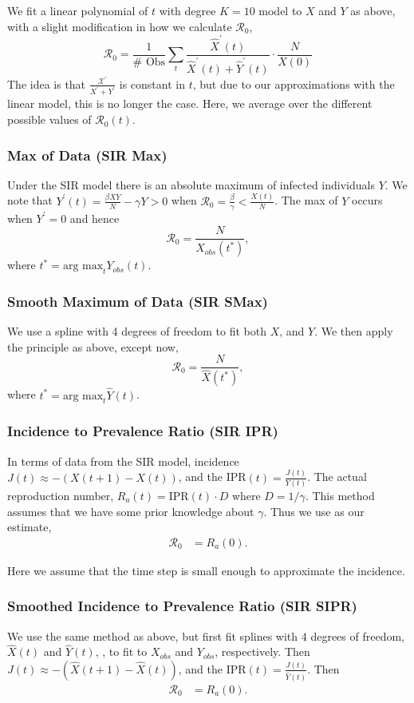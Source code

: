 \documentclass[12pt]{article}
\newcommand{\rr}{\ensuremath{\mathcal{R}_0}}
\begin{document}
We fit a linear polynomial of \(t\) with degree \(K= 10\) model to \(X\)
and \(Y\) as above, with a slight modification in how we calculate
\(\rr\),
\[\rr = \frac{1}{\# \text{ Obs}}\sum_t \frac{\hat{X}^\prime(t)}{ \hat{X}^\prime(t) + \hat{Y}^\prime(t)} \cdot \frac{N}{X(0)} \]
The idea is that $\frac{\mathcal{X}^\prime}{X^\prime + Y^\prime}$ is constant in $t$, but due to our approximations with the linear model, this is no longer the case.  Here, we average over the different possible values of $\rr(t)$.

\subsubsection{Max of Data (SIR Max)}\label{max-of-data}

Under the SIR model there is an absolute maximum of infected individuals $Y$.  We note that \(Y^\prime(t) = \frac{\beta XY}{N} - \gamma Y > 0\) when \(\rr = \frac{\beta}{\gamma} < \frac{X(t)}{N}\). The max
of \(Y\) occurs when \(Y^\prime = 0\) and hence
\[\rr = \frac{N}{X_{obs}(t^*)},\] where
\(t^* = \text{arg max}_{t} Y_{obs}(t)\).  

\subsubsection{Smooth Maximum of Data (SIR SMax)}\label{smooth-maximum-of-data}

We use a spline with 4 degrees of freedom to fit both \(X\), and \(Y\).
We then apply the principle as above, except now,
\[\rr = \frac{N}{\hat{X}(t^*)},\] where
\(t^* = \text{arg max}_{t} \hat{Y}(t)\). 

\subsubsection{Incidence to Prevalence
Ratio (SIR IPR)}\label{incidence-to-prevalence-ratio}
In terms of data from the SIR model, incidence $J(t) \approx -(X(t+1) - X(t))$, and the IPR$(t) = \frac{J(t)}{Y(t)}$. The actual reproduction number, $R_a(t) = \text{IPR}(t)\cdot D$ where $D = 1 /\gamma$.  This method assumes that we have some prior knowledge about $\gamma$.  Thus we use as our estimate,
\begin{align*}
\rr &= R_a(0).
\end{align*}

Here we assume that the time step is small enough to approximate the incidence.

\subsubsection{Smoothed Incidence to Prevalence Ratio (SIR SIPR)}
We use the same method as above, but first fit splines with 4 degrees of freedom, $\hat{X}(t)$ and $\hat{Y}(t)$, , to fit to $X_{obs}$ and $Y_{obs}$, respectively.  Then  $J(t) \approx -(\hat{X}(t+1) - \hat{X}(t))$, and the IPR$(t) = \frac{J(t)}{\hat{Y}(t)}$.  Then
\begin{align*}
\rr &= R_a(0).
\end{align*}
\end{document}
